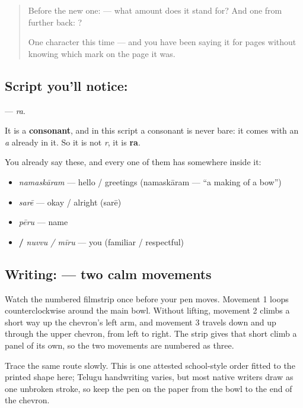 \label{lesson:TE-S06-letter-ra}



\begin{quote}
Before the new one:  — what amount does it stand for? And one from further back: ?

One character this time — and you have been saying it for pages without knowing which mark on the page it was.
\end{quote}

\subsection*{Script you'll notice: }
\textbf{} — \emph{ra}.

It is a \textbf{consonant}, and in this script a consonant is never bare: it comes with an \emph{a} already in it. So it is not \emph{r}, it is \textbf{ra}.

You already say these, and every one of them has  somewhere inside it:

\begin{itemize}
\raggedright
  \item \textbf{} \emph{namaskāram} — hello / greetings (namaskāram — \textquotedblleft{}a making of a bow\textquotedblright{})
  \item \textbf{} \emph{sarē} — okay / alright (sarē)
  \item \textbf{} \emph{pēru} — name
  \item \textbf{ / } \emph{nuvvu / mīru} — you (familiar / respectful)
\end{itemize}

\subsection*{Writing:  — two calm movements}

Watch the numbered filmstrip once before your pen moves. Movement 1 loops counterclockwise around the main bowl. Without lifting, movement 2 climbs a short way up the chevron's left arm, and movement 3 travels down and up through the upper chevron, from left to right. The strip gives that short climb a panel of its own, so the two movements are numbered as three.

Trace the same route slowly. This is one attested school-style order fitted to the printed shape here; Telugu handwriting varies, but most native writers draw  as one unbroken stroke, so keep the pen on the paper from the bowl to the end of the chevron.

